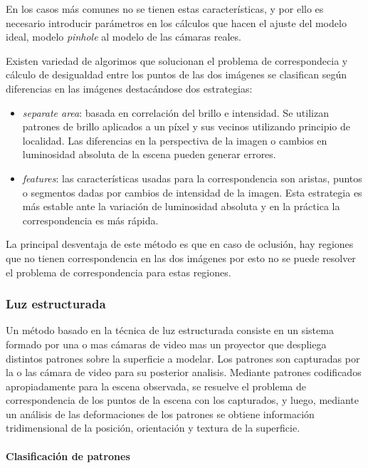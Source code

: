 En los casos más comunes no se tienen estas características, y por ello es necesario introducir parámetros en los cálculos que hacen el ajuste del modelo ideal, modelo \emph{pinhole} al modelo de las cámaras reales. 

Existen variedad de algorimos que solucionan el problema de correspondecia y cálculo de desigualdad entre los puntos de las dos imágenes se clasifican según diferencias en las imágenes destacándose dos estrategias:
\begin{itemize}
   \item \emph{separate area}: basada en correlación del brillo e intensidad. Se utilizan patrones de brillo aplicados a un píxel y sus vecinos utilizando principio de localidad. Las diferencias en la perspectiva de la imagen o cambios en luminosidad absoluta de la escena pueden generar errores.
   \item \emph{features}: las características usadas para la correspondencia son aristas, puntos o segmentos dadas por cambios de intensidad de la imagen. Esta estrategia es más estable ante la variación de luminosidad absoluta y en la práctica la correspondencia es más rápida.
\end{itemize}
La principal desventaja de este método es que en caso de oclusión, hay regiones que no tienen correspondencia en las dos imágenes por esto no se puede resolver el problema de correspondencia para estas regiones.

\subsubsection{Luz estructurada}

Un método basado en la técnica de luz estructurada consiste en un sistema formado por una o mas cámaras de video mas un proyector que despliega distintos patrones sobre la superficie a modelar. Los patrones son capturadas por la o las cámara de video para su posterior analisis. Mediante patrones codificados apropiadamente para la escena observada, se resuelve el problema de correspondencia de los puntos de la escena con los capturados, y luego, mediante un análisis de las deformaciones de los patrones se obtiene información tridimensional de la posición, orientación y textura de la superficie\cite{SLightPatterns}.

\paragraph{Clasificación de patrones}

